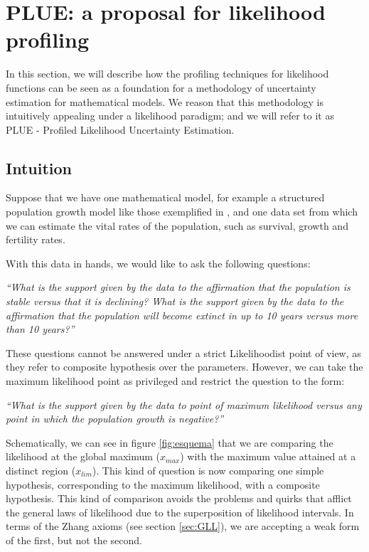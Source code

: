 \documentclass[twoside,12pt,a4paper]{article}
\begin{document}
\section{PLUE: a proposal for likelihood profiling}\label{sec:plue}

In this section, we will describe how the profiling techniques for likelihood functions can be 
seen as a foundation for a methodology of uncertainty estimation for mathematical models.
We reason that this methodology is intuitively appealing under a likelihood paradigm; and we will
refer to it as PLUE - Profiled Likelihood Uncertainty Estimation.

\subsection{Intuition}

Suppose that we have one mathematical model, for example a structured population growth model
like those exemplified in \citep{Chalom12}, and one data set from which we can estimate the 
vital rates of the population, such as survival, growth and fertility rates.

With this data in hands, we would like to ask the following questions:

{\em ``What is the support given by the data to the affirmation that the population is stable {\em versus}
that it is declining? What is the support given by the data to the affirmation that the population will
become extinct in up to 10 years {\em versus} more than 10 years?''}

These questions cannot be answered under a strict Likelihoodist point of view, as they refer to
composite hypothesis over the parameters. However, we can take the maximum likelihood point as 
privileged and restrict the question to the form:

{\em ``What is the support given by the data to point of maximum likelihood {\em versus} any point in which
the population growth is negative?''}

Schematically, we can see in figure \ref{fig:esquema} that we are comparing the likelihood at the global
maximum ($x_{max}$) with the maximum value attained at a distinct region ($x_{lim}$). This kind of question
is now comparing one simple hypothesis, corresponding to the maximum likelihood, with a composite hypothesis.
This kind of comparison avoids the problems and quirks that afflict the general laws of likelihood due to
the superposition of likelihood intervals. In terms of the Zhang axioms (see section \ref{sec:GLL}),
we are accepting a weak form of the first, but not the second.
\end{document}
